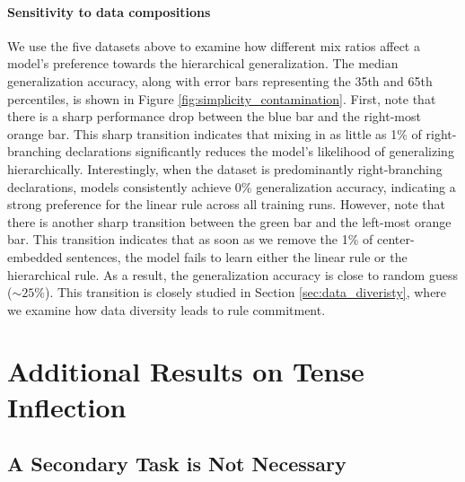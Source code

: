 \paragraph{Sensitivity to data compositions}  We use the five datasets above to examine how different mix ratios affect a model's preference towards the hierarchical generalization. The median generalization accuracy, along with error bars representing the 35th and 65th percentiles, is shown in Figure \ref{fig:simplicity_contamination}. First, note that there is a sharp performance drop between the blue bar and the right-most orange bar. This sharp transition indicates that mixing in as little as 1\% of right-branching declarations significantly reduces the model's likelihood of generalizing hierarchically. Interestingly, when the dataset is predominantly right-branching declarations, models consistently achieve 0\% generalization accuracy, indicating a strong preference for the linear rule across all training runs. However, note that there is another sharp transition between the green bar and the left-most orange bar. This transition indicates that as soon as we remove the 1\% of center-embedded sentences, the model fails to learn either the linear rule or the hierarchical rule. As a result, the generalization accuracy is close to random guess ($\sim 25\%$). This transition is closely studied in Section \ref{sec:data_diveristy}, where we examine how data diversity leads to rule commitment. 


\section{Additional Results on Tense Inflection} 
\subsection{A Secondary Task is Not Necessary}
\label{appdx:ti_secondary}


